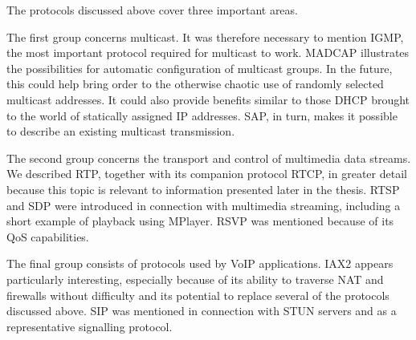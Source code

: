 The protocols discussed above cover three important areas.

The first group concerns multicast. It was therefore necessary to mention IGMP, the most important protocol required for multicast to work. MADCAP illustrates the possibilities for automatic configuration of multicast groups. In the future, this could help bring order to the otherwise chaotic use of randomly selected multicast addresses. It could also provide benefits similar to those DHCP brought to the world of statically assigned IP addresses. SAP, in turn, makes it possible to describe an existing multicast transmission.

The second group concerns the transport and control of multimedia data streams. We described RTP, together with its companion protocol RTCP, in greater detail because this topic is relevant to information presented later in the thesis. RTSP and SDP were introduced in connection with multimedia streaming, including a short example of playback using MPlayer. RSVP was mentioned because of its QoS capabilities.

The final group consists of protocols used by VoIP applications. IAX2 appears particularly interesting, especially because of its ability to traverse NAT and firewalls without difficulty and its potential to replace several of the protocols discussed above. SIP was mentioned in connection with STUN servers and as a representative signalling protocol.
\proofed
